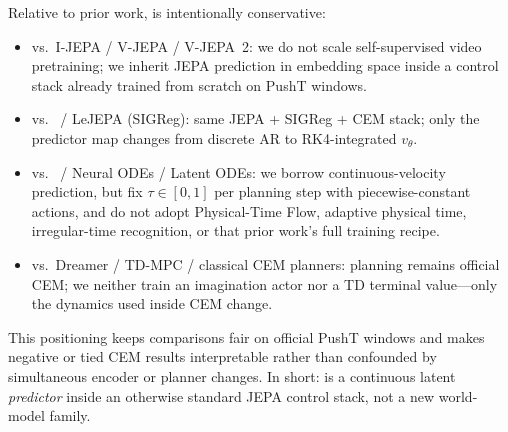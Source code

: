 Relative to prior work, \method{} is intentionally conservative:
\begin{itemize}[leftmargin=*,itemsep=2pt]
\item vs.\ I-JEPA / V-JEPA / V-JEPA~2:
  we do not scale self-supervised video pretraining; we inherit JEPA
  prediction in embedding space inside a control stack already trained
  from scratch on PushT windows.
\item vs.\ \LeWM{} / LeJEPA (SIGReg):
  same JEPA + SIGReg + CEM stack; only the predictor map changes from
  discrete AR to RK4-integrated $v_\theta$.
\item vs.\ \PriorODEWorld{} / Neural ODEs / Latent ODEs:
  we borrow continuous-velocity prediction, but fix
  $\tau\in[0,1]$ per planning step with piecewise-constant actions,
  and do not adopt Physical-Time Flow, adaptive physical time,
  irregular-time recognition, or that prior work's full training recipe.
\item vs.\ Dreamer / TD-MPC / classical CEM planners:
  planning remains official \LeWM{} CEM; we neither train an
  imagination actor nor a TD terminal value---only the dynamics used
  inside CEM change.
\end{itemize}
This positioning keeps comparisons fair on official PushT windows and
makes negative or tied CEM results interpretable rather than confounded
by simultaneous encoder or planner changes.
In short: \method{} is a continuous latent \emph{predictor} inside an
otherwise standard JEPA control stack, not a new world-model family.
